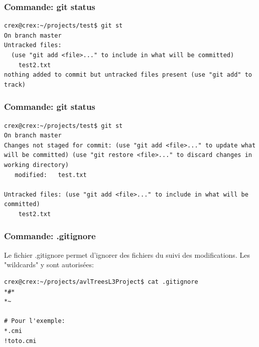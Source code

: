 \documentclass{beamer}
\begin{document}
\begin{frame}[fragile]
\frametitle{Commande: git status}

    \begin{mdframed}[style=Bash]
    \begin{lstlisting}[style=Bash, caption={git status après commit}]
crex@crex:~/projects/test$ git st
On branch master
Untracked files:
  (use "git add <file>..." to include in what will be committed)
	test2.txt
nothing added to commit but untracked files present (use "git add" to track)
    \end{lstlisting}
    \end{mdframed}

\end{frame}


\begin{frame}[fragile]
\frametitle{Commande: git status}

    \begin{mdframed}[style=Bash]
    \begin{lstlisting}[style=Bash, caption={git status modification de test.txt}]
crex@crex:~/projects/test$ git st
On branch master
Changes not staged for commit: (use "git add <file>..." to update what will be committed) (use "git restore <file>..." to discard changes in working directory)
   modified:   test.txt

Untracked files: (use "git add <file>..." to include in what will be committed)
	test2.txt
    \end{lstlisting}
    \end{mdframed}

\end{frame}

\begin{frame}[fragile]
\frametitle{Commande: .gitignore}
Le fichier .gitignore permet d'ignorer des fichiers du suivi des modifications. Les "wildcards" y sont autorisées:
\medskip
\begin{mdframed}[style=Bash]
    \begin{lstlisting}[style=Bash, caption={Contenu du dossier .git/}]
crex@crex:~/projects/avlTreesL3Project$ cat .gitignore 
*#*
*~

# Pour l'exemple:
*.cmi
!toto.cmi
    \end{lstlisting}
    \end{mdframed}
\end{frame}
\end{document}
